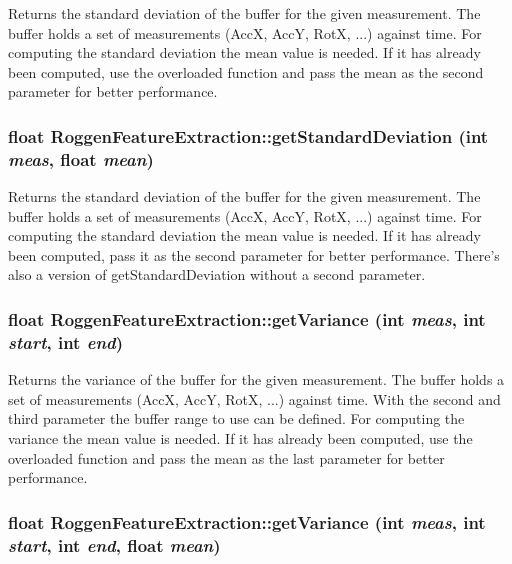 \label{classRoggenFeatureExtraction_abfa00feefa7124b6a8a9e20ca9b9c196}
Returns the standard deviation of the buffer for the given measurement. The buffer holds a set of measurements (AccX, AccY, RotX, ...) against time. For computing the standard deviation the mean value is needed. If it has already been computed, use the overloaded function and pass the mean as the second parameter for better performance. \hypertarget{classRoggenFeatureExtraction_a2ed43ed995832b02eca20c700b26f5bc}{
\subsubsection[{getStandardDeviation}]{\setlength{\rightskip}{0pt plus 5cm}float RoggenFeatureExtraction::getStandardDeviation (int {\em meas}, \/  float {\em mean})}}
\label{classRoggenFeatureExtraction_a2ed43ed995832b02eca20c700b26f5bc}
Returns the standard deviation of the buffer for the given measurement. The buffer holds a set of measurements (AccX, AccY, RotX, ...) against time. For computing the standard deviation the mean value is needed. If it has already been computed, pass it as the second parameter for better performance. There's also a version of getStandardDeviation without a second parameter. \hypertarget{classRoggenFeatureExtraction_ac48e7423605dd4f0b449d081cccc77bf}{
\subsubsection[{getVariance}]{\setlength{\rightskip}{0pt plus 5cm}float RoggenFeatureExtraction::getVariance (int {\em meas}, \/  int {\em start}, \/  int {\em end})}}
\label{classRoggenFeatureExtraction_ac48e7423605dd4f0b449d081cccc77bf}
Returns the variance of the buffer for the given measurement. The buffer holds a set of measurements (AccX, AccY, RotX, ...) against time. With the second and third parameter the buffer range to use can be defined. For computing the variance the mean value is needed. If it has already been computed, use the overloaded function and pass the mean as the last parameter for better performance. \hypertarget{classRoggenFeatureExtraction_a6d66fc557929d6be589640e4f2325991}{
\subsubsection[{getVariance}]{\setlength{\rightskip}{0pt plus 5cm}float RoggenFeatureExtraction::getVariance (int {\em meas}, \/  int {\em start}, \/  int {\em end}, \/  float {\em mean})}}
